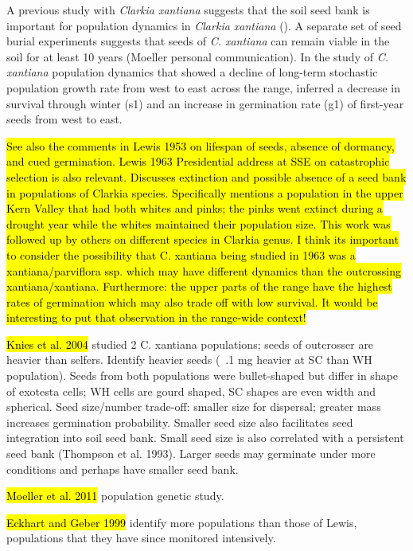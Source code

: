 \documentclass[12pt, oneside, titlepage]{article}   	%
\begin{document}
A previous study with \textit{Clarkia xantiana} suggests that the soil seed bank is important for population dynamics in \textit{Clarkia xantiana} (\cite{eckhart2011}). A separate set of seed burial experiments suggests that seeds of \textit{C. xantiana} can remain viable in the soil for at least 10 years (Moeller personal communication). In the study of \textit{C. xantiana} population dynamics that showed a decline of long-term stochastic population growth rate from west to east across the range, \cite{eckhart2011} inferred a decrease in survival through winter (s1) and an increase in germination rate (g1) of first-year seeds from west to east.

\hl{See also the comments in Lewis 1953 on lifespan of seeds, absence of dormancy, and cued germination. Lewis 1963 Presidential address at SSE on catastrophic selection is also relevant. Discusses extinction and possible absence of a seed bank in populations of Clarkia species. Specifically mentions a population in the upper Kern Valley that had both whites and pinks; the pinks went extinct during a drought year while the whites maintained their population size. This work was followed up by others on different species in Clarkia genus. I think its important to consider the possibility that C. xantiana being studied in 1963 was a xantiana/parviflora ssp. which may have different dynamics than the outcrossing xantiana/xantiana. Furthermore: the upper parts of the range have the highest rates of germination which may also trade off with low survival. It would be interesting to put that observation in the range-wide context!} 

\hl{Knies et al. 2004} studied 2 C. xantiana populations; seeds of outcrosser are heavier than selfers. Identify heavier seeds (~.1 mg heavier at SC than WH population). Seeds from both populations were bullet-shaped but differ in shape of exotesta cells; WH cells are gourd shaped, SC shapes are even width and spherical. Seed size/number trade-off: smaller size for dispersal; greater mass increases germination probability. Smaller seed size also facilitates seed integration into soil seed bank. Small seed size is also correlated with a persistent seed bank (Thompson et al. 1993). Larger seeds may germinate under more conditions and perhaps have smaller seed bank.

\hl{Moeller et al. 2011} population genetic study. 

\hl{Eckhart and Geber 1999} identify more populations than those of Lewis, populations that they have since monitored intensively. 
\end{document}
